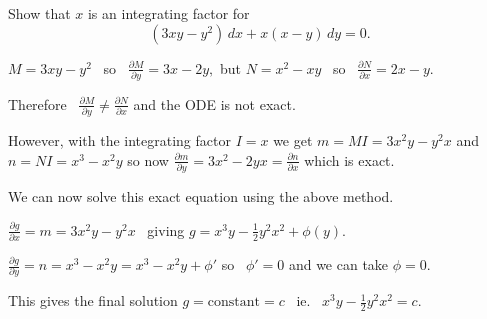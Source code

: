 \begin{example}
    Show that $x$ is an integrating factor for \[(3xy-y^2)\,dx+x(x-y)\, dy=0.\]
    
    $M=3xy-y^2$ \ so \ $\frac{\partial M}{\partial y}=3x-2y,$ but $N=x^2-xy$ \ so \  $\frac{\partial N}{\partial x}=2x-y.$

    Therefore \ $\frac{\partial M}{\partial y}\ne \frac{\partial N}{\partial x}$ and the ODE is not exact.

    However, with the integrating factor $I=x$ we get $m=MI=3x^2y-y^2x$ and $n=NI=x^3-x^2y$ so now $\frac{\partial m}{\partial y}=3x^2-2yx= \frac{\partial n}{\partial x}$ which is exact.
    
    We can now solve this exact equation using the above method. 

    $\frac{\partial g}{\partial x}=m=3x^2y-y^2x$ \ giving $g=x^3y-\frac{1}{2}y^2x^2+\phi(y).$ 

    $\frac{\partial g}{\partial y}=n=x^3-x^2y=x^3-x^2y+\phi'$ so \ $\phi'=0$ and we can take $\phi=0.$ 

    This gives the final solution $g=\text{constant}=c$ \ ie. \  $x^3y-\frac{1}{2}y^2x^2=c.$
\end{example}

\newpage
